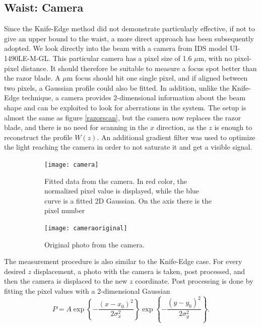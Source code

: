 \subsection{Waist: Camera}
Since the Knife-Edge method did not demonstrate particularly effective, if not to give an upper bound to the waist, a more direct approach has been subsequently adopted. We look directly into the beam with a camera from IDS model UI-1490LE-M-GL. This particular camera has a pixel size of 1.6 $\mu$m, with no pixel-pixel distance. It should therefore be suitable to measure a focus spot better than the razor blade. A $\mu$m focus should hit one single pixel, and if aligned between two pixels, a Gaussian profile could also be fitted.
In addition, unlike the Knife-Edge technique, a camera provides 2-dimensional information about the beam shape and can be exploited to look for aberrations in the system. The setup is almost the same as figure \ref{razorscan}, but the camera now replaces the razor blade, and there is no need for scanning in the $x$ direction, as the $z$ is enough to reconstruct the profile $W(z)$. An additional gradient filter was used to optimize the light reaching the camera in order to not saturate it and get a visible signal.
\begin{figure}
     \centering
     \begin{subfigure}[b]{0.67\textwidth}
         \centering
         \texttt{[image: camera]}
          \caption{Fitted data from the camera. In red color, the normalized pixel value is displayed, while the blue curve is a fitted 2D Gaussian. On the axis there is the pixel number}
     \end{subfigure}
     \hfill
     \begin{subfigure}[b]{0.3\textwidth}
         \centering
         \texttt{[image: cameraoriginal]}
        \vspace{5em}
         \caption{Original photo from the camera.}

     \end{subfigure}
        \caption{}
       \label{fig:camera}
\end{figure}
The measurement procedure is also similar to the Knife-Edge case. For every desired $z$ displacement, a photo with the camera is taken, post processed, and then the camera is displaced to the new $z$ coordinate. Post processing is done by fitting the pixel values with a 2-dimensional Gaussian
\begin{equation}
P = A \exp\left\{-\frac{(x-x_0)^2}{2\sigma_x^2}\right\} \exp\left\{-\frac{(y-y_0)^2}{2\sigma_y^2} \right\}.
\end{equation}
